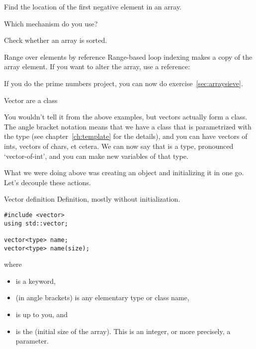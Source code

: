 \begin{exercise}
  \label{ex:array-maxidx}
  Find the location of the first negative element in an array.

  Which mechanism do you use?
\end{exercise}

\begin{exercise}
  \label{ex:array-sorted}
  Check whether an array is sorted.
\end{exercise}

\begin{block}{Range over elements by reference}
  \label{sl:array-range-ref}
  Range-based loop indexing makes a copy of the array element. If you
  want to alter the array, use a reference:
\end{block}

\begin{exercise}
  If you do the prime numbers project, you can now do exercise~\ref{sec:arraysieve}.
\end{exercise}

 {Vector are a class}
\label{sec:stdvector}

You wouldn't tell it from the above examples, but vectors actually
form a  class. The angle bracket notation means
that we have a class that is parametrized with the type (see
chapter~\ref{ch:template} for the details), and you can
have vectors of ints, vectors of chars, et cetera. We can now say that
 is a type, pronounced `vector-of-int', and you can
make new variables of that type.

What we were doing above was creating an object and initializing it in
one go. Let's decouple these actions.

\begin{block}{Vector definition}
  \label{sl:vector-def}
  Definition, mostly without initialization.
\begin{verbatim}
#include <vector>
using std::vector;

vector<type> name;
vector<type> name(size);
\end{verbatim}
where
\begin{itemize}
\item {} is a keyword,
\item {} (in angle brackets) is any elementary type or class
  name,
\item {} is up to you, and
\item {} is the (initial size of the array). This is an integer,
  or more precisely, a  parameter.
\end{itemize}
\end{block}

